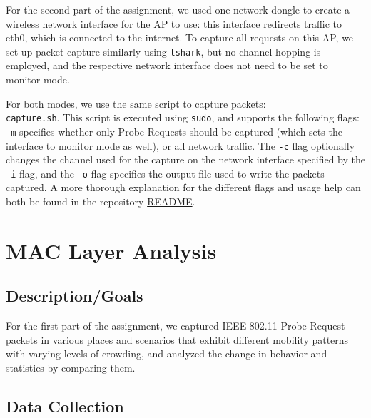 \documentclass[sigconf,nonacm]{acmart}
\begin{document}
For the second part of the assignment, we used one network dongle to create a wireless network interface for the AP to use: this interface redirects traffic to eth0, which is connected to the internet. To capture all requests on this AP, we set up packet capture similarly using \verb|tshark|, but no channel-hopping is employed, and the respective network interface does not need to be set to monitor mode.

For both modes, we use the same script to capture packets: \\ \verb|capture.sh|. This script is executed using \verb|sudo|, and supports the following flags: \verb|-m| specifies whether only Probe Requests should be captured (which sets the interface to monitor mode as well), or all network traffic. The \verb|-c| flag optionally changes the channel used for the capture on the network interface specified by the \verb|-i| flag, and the \verb|-o| flag specifies the output file used to write the packets captured. A more thorough explanation for the different flags and usage help can both be found in the repository \href{https://github.com/yusuferdemnacar/connected-mobility-basics-group-7/blob/main/assignment-2/README.md}{\color{blue}README}. 

\section{MAC Layer Analysis}
\label{sec:part-1}

\subsection{Description/Goals}
\label{sec:part-1/desc}
For the first part of the assignment, we captured IEEE 802.11 Probe Request packets in various places and scenarios that exhibit different mobility patterns with varying levels of crowding, and analyzed the change in behavior and statistics by comparing them.


\subsection{Data Collection}
\label{sec:part-1/da-co}

\end{document}
